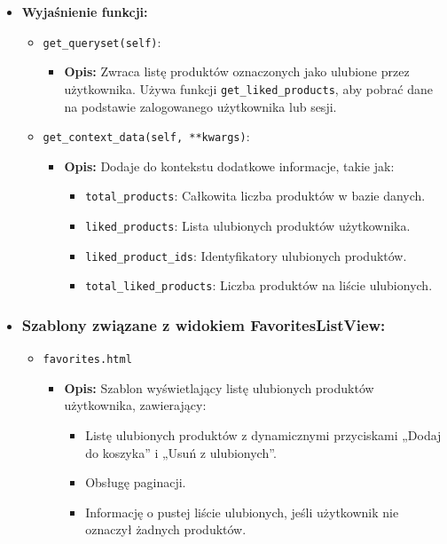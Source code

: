 \documentclass[12pt,a4paper,oneside]{article}
\theoremstyle{definition}
\numberwithin{equation}{section}
\begin{document}
\begin{itemize}
    \item \textbf{Wyjaśnienie funkcji:}
        \begin{itemize}
            \item \texttt{get\_queryset(self)}:
            \begin{itemize}
                \item \textbf{Opis:} Zwraca listę produktów oznaczonych jako ulubione przez użytkownika. Używa funkcji \texttt{get\_liked\_products}, aby pobrać dane na podstawie zalogowanego użytkownika lub sesji.
            \end{itemize}
            \item \texttt{get\_context\_data(self, **kwargs)}:
            \begin{itemize}
                \item \textbf{Opis:} Dodaje do kontekstu dodatkowe informacje, takie jak:
                \begin{itemize}
                    \item \texttt{total\_products}: Całkowita liczba produktów w bazie danych.
                    \item \texttt{liked\_products}: Lista ulubionych produktów użytkownika.
                    \item \texttt{liked\_product\_ids}: Identyfikatory ulubionych produktów.
                    \item \texttt{total\_liked\_products}: Liczba produktów na liście ulubionych.
                \end{itemize}
            \end{itemize}
        \end{itemize}

    \item \subsubsection{Szablony związane z widokiem FavoritesListView:}
        \begin{itemize}
            \item \texttt{favorites.html}
                \begin{itemize}
                    \item \textbf{Opis:} Szablon wyświetlający listę ulubionych produktów użytkownika, zawierający:
                    \begin{itemize}
                        \item Listę ulubionych produktów z dynamicznymi przyciskami „Dodaj do koszyka” i „Usuń z ulubionych”.
                        \item Obsługę paginacji.
                        \item Informację o pustej liście ulubionych, jeśli użytkownik nie oznaczył żadnych produktów.
                    \end{itemize}
                \end{itemize}
        \end{itemize}


\end{itemize}
\end{document}
